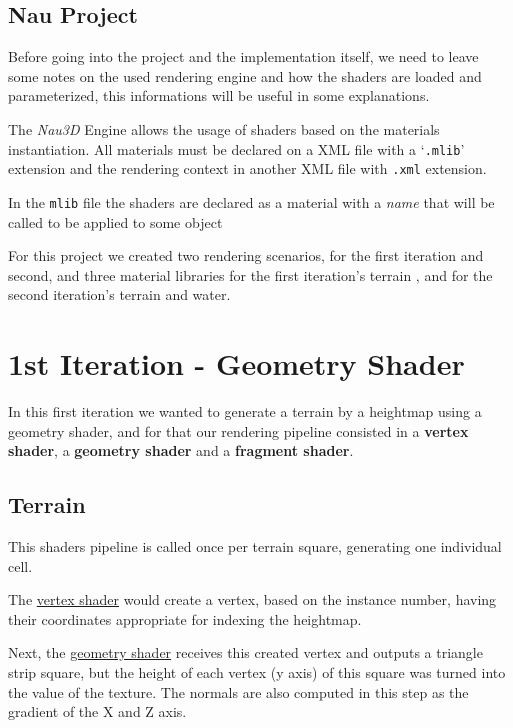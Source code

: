 \documentclass[a4paper]{report}
\begin{document}
\section{Nau Project}

Before going into the project and the implementation itself, we need to leave some notes on the used rendering
engine and how the shaders are loaded and parameterized, this informations will be useful in some explanations.

The \textit{Nau3D} Engine allows the usage of shaders based on the materials instantiation. All materials must
be declared on a XML file with a `\texttt{.mlib}' extension and the rendering context in another XML file with
\texttt{.xml} extension.

In the \texttt{mlib} file the shaders are declared as a material with a \textit{name} that will be called to
be applied to some object

For this project we created two rendering scenarios, for the first iteration and second, and three material
libraries for the first iteration's terrain , and for the second iteration's terrain and water.


\chapter{1st Iteration - Geometry Shader}


In this first iteration we wanted to generate a terrain by a heightmap using a geometry shader, and for that
our rendering pipeline consisted in a \textbf{vertex shader}, a \textbf{geometry shader} and a \textbf{fragment
shader}.

\section{Terrain}

This shaders pipeline is called once per terrain square, generating one individual cell. 
\newline

The \underline{vertex shader} would create a vertex, based on the instance number, having their coordinates
appropriate for indexing the heightmap.

Next, the \underline{geometry shader} receives this created vertex and outputs a triangle strip square, but
the height of each vertex (y axis) of this square was turned into the value of the texture. The normals are
also computed in this step as the gradient of the X and Z axis.
\end{document}
